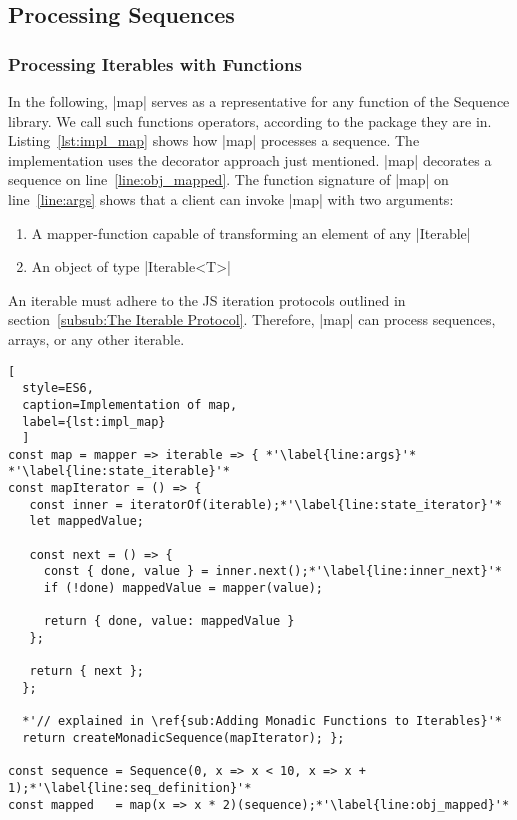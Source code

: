 \subsection{Processing Sequences}
\label{sub:Processing Sequences}

\subsubsection{Processing Iterables with Functions}
\label{subsub:Processing Iterables with Functions}
In the following, |map| serves as a representative for any function of the
Sequence library. We call such functions operators, according
to the package they are in.
Listing~\ref{lst:impl_map} shows how |map| processes a sequence. The
implementation uses the decorator approach just mentioned. |map| decorates a
sequence on line~\ref{line:obj_mapped}.
\newline
The function signature of |map| on line~\ref{line:args} shows that a client
can invoke |map| with two arguments:

\begin{enumerate}
  \item{A mapper-function capable of transforming an element of any |Iterable|}
  \item{An object of type |Iterable<T>|}
\end{enumerate}

An iterable must adhere to the JS iteration protocols outlined in
section~\ref{subsub:The Iterable Protocol}. Therefore, |map| can process
sequences, arrays, or any other iterable. 

\begin{lstlisting}[
  style=ES6, 
  caption=Implementation of map,
  label={lst:impl_map}
  ]
const map = mapper => iterable => { *'\label{line:args}'*
*'\label{line:state_iterable}'*
const mapIterator = () => {
   const inner = iteratorOf(iterable);*'\label{line:state_iterator}'*
   let mappedValue;
 
   const next = () => {
     const { done, value } = inner.next();*'\label{line:inner_next}'*
     if (!done) mappedValue = mapper(value);
 
     return { done, value: mappedValue }
   };
 
   return { next };
  };

  *'// explained in \ref{sub:Adding Monadic Functions to Iterables}'*
  return createMonadicSequence(mapIterator); };

const sequence = Sequence(0, x => x < 10, x => x + 1);*'\label{line:seq_definition}'*
const mapped   = map(x => x * 2)(sequence);*'\label{line:obj_mapped}'*
\end{lstlisting}

